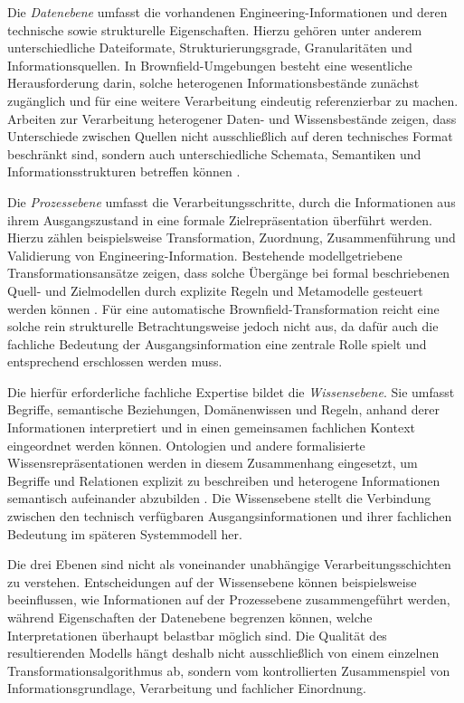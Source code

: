 Die \emph{Datenebene} umfasst die vorhandenen Engineering-Informationen und
deren technische sowie strukturelle Eigenschaften. Hierzu gehören unter
anderem unterschiedliche Dateiformate, Strukturierungsgrade, Granularitäten
und Informationsquellen. In Brownfield-Umgebungen besteht eine wesentliche
Herausforderung darin, solche heterogenen Informationsbestände zunächst
zugänglich und für eine weitere Verarbeitung eindeutig referenzierbar zu
machen. Arbeiten zur Verarbeitung heterogener Daten- und Wissensbestände
zeigen, dass Unterschiede zwischen Quellen nicht ausschließlich auf deren
technisches Format beschränkt sind, sondern auch unterschiedliche Schemata,
Semantiken und Informationsstrukturen betreffen können
\cite{Maheshwari2018,Tian.2025,Chis.2025}.

Die \emph{Prozessebene} umfasst die Verarbeitungsschritte, durch die
Informationen aus ihrem Ausgangszustand in eine formale Zielrepräsentation
überführt werden. Hierzu zählen beispielsweise Transformation, Zuordnung,
Zusammenführung und Validierung von Engineering-Information. Bestehende
modellgetriebene Transformationsansätze zeigen, dass solche Übergänge bei
formal beschriebenen Quell- und Zielmodellen durch explizite Regeln und
Metamodelle gesteuert werden können
\cite{Kapos.2014,Li.2022,Zhou.2024}. Für eine automatische
Brownfield-Transformation reicht eine solche rein strukturelle
Betrachtungsweise jedoch nicht aus, da dafür auch die fachliche Bedeutung der
Ausgangsinformation eine zentrale Rolle spielt und entsprechend erschlossen
werden muss.

Die hierfür erforderliche fachliche Expertise bildet die
\emph{Wissensebene}. Sie umfasst Begriffe, semantische Beziehungen,
Domänenwissen und Regeln, anhand derer Informationen interpretiert und in
einen gemeinsamen fachlichen Kontext eingeordnet werden können. Ontologien
und andere formalisierte Wissensrepräsentationen werden in diesem
Zusammenhang eingesetzt, um Begriffe und Relationen explizit zu beschreiben
und heterogene Informationen semantisch aufeinander abzubilden
\cite{Abonyi.2024,Meyers.2013,Meng.2025}. Die Wissensebene stellt die
Verbindung zwischen den technisch verfügbaren Ausgangsinformationen und ihrer
fachlichen Bedeutung im späteren Systemmodell her.
\newpage

Die drei Ebenen sind nicht als voneinander unabhängige Verarbeitungsschichten
zu verstehen. Entscheidungen auf der Wissensebene können beispielsweise
beeinflussen, wie Informationen auf der Prozessebene zusammengeführt werden,
während Eigenschaften der Datenebene begrenzen können, welche
Interpretationen überhaupt belastbar möglich sind. Die Qualität des
resultierenden Modells hängt deshalb nicht ausschließlich von einem einzelnen
Transformationsalgorithmus ab, sondern vom kontrollierten Zusammenspiel von
Informationsgrundlage, Verarbeitung und fachlicher Einordnung.

